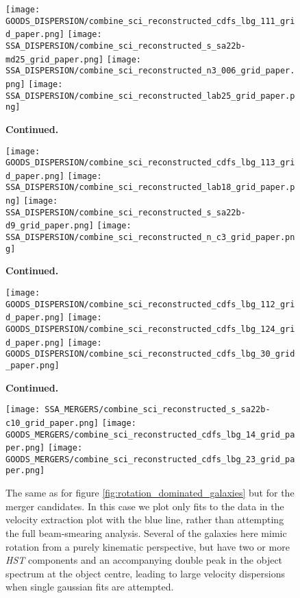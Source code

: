 \documentclass[fleqn,usenatbib]{mn2e}
\begin{document}
\begin{figure*}\ContinuedFloat
    \centering

    \texttt{[image: GOODS\_DISPERSION/combine\_sci\_reconstructed\_cdfs\_lbg\_111\_grid\_paper.png]}
    \texttt{[image: SSA\_DISPERSION/combine\_sci\_reconstructed\_s\_sa22b-md25\_grid\_paper.png]}
    \texttt{[image: SSA\_DISPERSION/combine\_sci\_reconstructed\_n3\_006\_grid\_paper.png]}
    \texttt{[image: SSA\_DISPERSION/combine\_sci\_reconstructed\_lab25\_grid\_paper.png]}

    \caption{\textbf{Continued.}}

\end{figure*}

\begin{figure*}\ContinuedFloat
    \centering

    \texttt{[image: GOODS\_DISPERSION/combine\_sci\_reconstructed\_cdfs\_lbg\_113\_grid\_paper.png]}
    \texttt{[image: SSA\_DISPERSION/combine\_sci\_reconstructed\_lab18\_grid\_paper.png]}
    \texttt{[image: SSA\_DISPERSION/combine\_sci\_reconstructed\_s\_sa22b-d9\_grid\_paper.png]}
    \texttt{[image: SSA\_DISPERSION/combine\_sci\_reconstructed\_n\_c3\_grid\_paper.png]}

    \caption{\textbf{Continued.}}

\end{figure*}

\begin{figure*}\ContinuedFloat
    \centering

    \texttt{[image: GOODS\_DISPERSION/combine\_sci\_reconstructed\_cdfs\_lbg\_112\_grid\_paper.png]}
    \texttt{[image: GOODS\_DISPERSION/combine\_sci\_reconstructed\_cdfs\_lbg\_124\_grid\_paper.png]}
    \texttt{[image: GOODS\_DISPERSION/combine\_sci\_reconstructed\_cdfs\_lbg\_30\_grid\_paper.png]}

    \caption{\textbf{Continued.}}

\end{figure*}


\begin{figure*}
    \centering

    \texttt{[image: SSA\_MERGERS/combine\_sci\_reconstructed\_s\_sa22b-c10\_grid\_paper.png]}
    \texttt{[image: GOODS\_MERGERS/combine\_sci\_reconstructed\_cdfs\_lbg\_14\_grid\_paper.png]}
    \texttt{[image: GOODS\_MERGERS/combine\_sci\_reconstructed\_cdfs\_lbg\_23\_grid\_paper.png]}

    \caption{The same as for figure \protect\ref{fig:rotation_dominated_galaxies} but for the merger candidates.
    In this case we plot only fits to the data in the velocity extraction plot with the blue line, rather than attempting the full beam-smearing analysis.
    Several of the galaxies here mimic rotation from a purely kinematic perspective, but have two or more {\em HST} components and an accompanying double peak in the object spectrum at the object centre, leading to large velocity dispersions when single gaussian fits are attempted.}
    \label{fig:merger_galaxies}
\end{figure*}
\end{document}

